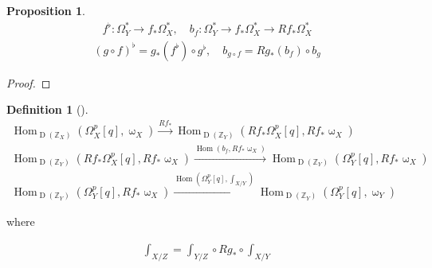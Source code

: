 \documentclass[a4paper,dvipdfmx,reqno,12pt]{amsart}
\theoremstyle{definition}
\newtheorem{Def}[Thm]{Definition}
\newtheorem{Prop}[Thm]{Proposition}
\newcommand{\Z}{\mathbb{Z}}%
\newcommand{\opn}[1]{\operatorname{#1}}
\newcommand{\xto}[1]{\xrightarrow{#1}}
\numberwithin{equation}{section}
\begin{document}
\begin{Prop}

  \begin{align}
    f^{\flat}:\Omega_Y^{*}\to f_*\Omega_X^{*}, \quad b_f: \Omega_Y^{*}\to f_*\Omega_X^{*} \to Rf_*\Omega_X^{*}
  \end{align}
  \begin{align}
    (g\circ f)^{\flat}=g_*(f^{\flat})\circ g^{\flat},
    \quad b_{g\circ f}=Rg_*(b_f)\circ b_g
  \end{align}
\end{Prop}
\begin{proof}

\end{proof}

\begin{Def}[{\cite[Definition 4.9]{gross2019sheaftheoretic}}]

  \begin{align}
    \opn{Hom}_{\opn{D}(\Z_X)}(\Omega_X^{p}[q],\upomega_X)\xto{Rf_*}
    \opn{Hom}_{\opn{D}(\Z_Y)}(Rf_*\Omega_X^{p}[q],Rf_*\upomega_X)
    \\
    \opn{Hom}_{\opn{D}(\Z_Y)}(Rf_*\Omega_X^{p}[q],Rf_*\upomega_X)
    \xto{\opn{Hom}(b_{f},Rf_*\upomega_X)}
    \opn{Hom}_{\opn{D}(\Z_Y)}(\Omega^{p}_Y[q],Rf_*\upomega_X) \\
    \opn{Hom}_{\opn{D}(\Z_Y)}(\Omega^{p}_Y[q],Rf_*\upomega_X)
    \xto{\opn{Hom}(\Omega_Y^{p}[q],\int_{X/Y})} \opn{Hom}_{\opn{D}(\Z_Y)}(\Omega_Y^{p}[q],\upomega_Y)
  \end{align}

  where

\end{Def}

\begin{align}
  \int_{X/Z}=\int_{Y/Z} \circ Rg_*\circ \int_{X/Y}
\end{align}
\end{document}
